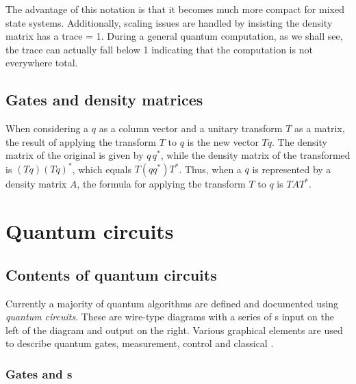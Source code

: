  The advantage of this notation is
that it becomes much more compact for mixed state systems. Additionally,
scaling issues are handled by insisting the density matrix has a trace = 1.
During a general quantum computation, as we shall see,
the trace can actually fall below 1 indicating
that the computation is not everywhere total.


\subsection{Gates and density matrices} %
\label{sub:gates_and_density_matrices}


When considering  a \qubit{} $q$ as a column vector and
a unitary  transform $T$ as a matrix, the  result of applying the transform
$T$ to $q$ is the new vector $T q$. The
 density matrix of the original \qubit{} is given by $q\, q^{*}$, while
the density matrix of the transformed \qubit{} is
$(T q) ( T q)^{*}$, which equals $ T (q q^{*}) T^{*}$. Thus, when
a \qubit{} $q$ is represented by a density matrix $A$, the
formula for applying the transform $T$ to $q$ is $T A T^{*}$.







\section{Quantum circuits} %
\label{sec:quantum_circuits}

\subsection{Contents of quantum circuits} %
\label{sub:contents_of_quantum_circuits}


Currently a majority of quantum algorithms are defined and documented
using \emph{quantum circuits}. These are wire-type diagrams with a series of
\qubit{}s input on the left of the diagram and output on the right. Various
graphical elements are used to describe quantum gates, measurement, control
and classical \bits.

\subsubsection{Gates and \qubit{}s} %
\label{ssub:gates_and_qubits}



